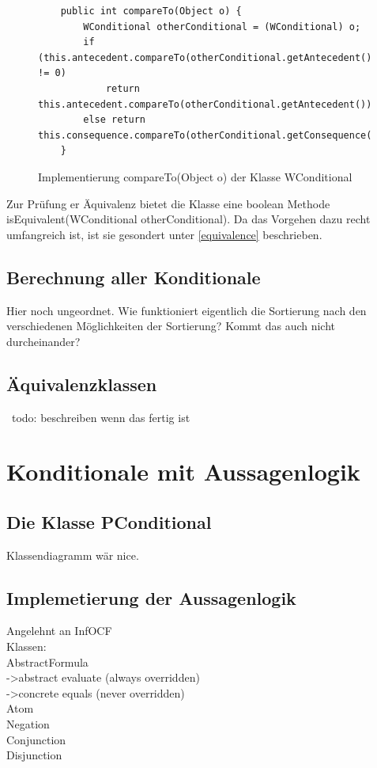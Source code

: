\documentclass[12pt,a4paper]{article}
\begin{document}
\begin{figure}
\begin{lstlisting}
    public int compareTo(Object o) {
        WConditional otherConditional = (WConditional) o;
        if (this.antecedent.compareTo(otherConditional.getAntecedent()) != 0)
            return this.antecedent.compareTo(otherConditional.getAntecedent());
        else return this.consequence.compareTo(otherConditional.getConsequence());
    }
\end{lstlisting}
\caption{Implementierung compareTo(Object o) der Klasse WConditional}
\label{compare-wconditonal}
\end{figure} 
Zur Prüfung er Äquivalenz bietet die Klasse eine boolean Methode isEquivalent(WConditional otherConditional). Da das Vorgehen dazu recht umfangreich ist, ist sie gesondert unter \ref{equivalence} beschrieben.
\subsection{Berechnung aller Konditionale}
Hier noch ungeordnet. Wie funktioniert eigentlich die Sortierung nach den verschiedenen Möglichkeiten der Sortierung? Kommt das auch nicht durcheinander?
\subsection{Äquivalenzklassen}
\
todo: beschreiben wenn das fertig ist
\label{equivalence}
\section{Konditionale mit Aussagenlogik}
\subsection{Die Klasse PConditional}
Klassendiagramm wär nice.
\subsection{Implemetierung der Aussagenlogik}
Angelehnt an InfOCF \\
Klassen: \\
AbstractFormula\\
->abstract evaluate (always overridden)\\
->concrete equals (never overridden)\\
Atom\\
Negation\\
Conjunction\\
Disjunction\\
\end{document}
